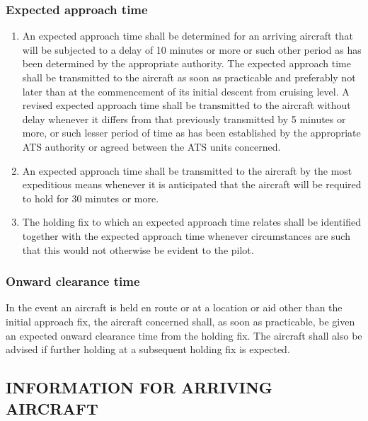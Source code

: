 \documentclass[../vATM.tex]{subfiles}
\begin{document}
    \subsubsection{Expected approach time}

    \begin{enumerate}
        \item An expected approach time shall be determined for an arriving aircraft that will be subjected to a delay of 10 minutes or more or such other period as has been determined by the appropriate authority. The expected approach time shall be transmitted to the aircraft as soon as practicable and preferably not later than at the commencement of its initial descent from cruising level. A revised expected approach time shall be transmitted to the aircraft without delay whenever it differs from that previously transmitted by 5 minutes or more, or such lesser period of time as has been established by the appropriate ATS authority or agreed between the ATS units concerned.
        \item An expected approach time shall be transmitted to the aircraft by the most expeditious means whenever it is anticipated that the aircraft will be required to hold for 30 minutes or more.
        \item The holding fix to which an expected approach time relates shall be identified together with the expected approach time whenever circumstances are such that this would not otherwise be evident to the pilot.
    \end{enumerate}

    \subsubsection{Onward clearance time} \label{6.5.8}

    In the event an aircraft is held en route or at a location or aid other than the initial approach fix, the aircraft concerned shall, as soon as practicable, be given an expected onward clearance time from the holding fix. The aircraft shall also be advised if further holding at a subsequent holding fix is expected.

    \subsection[Information for arriving aircraft]{INFORMATION FOR ARRIVING AIRCRAFT}
\end{document}
